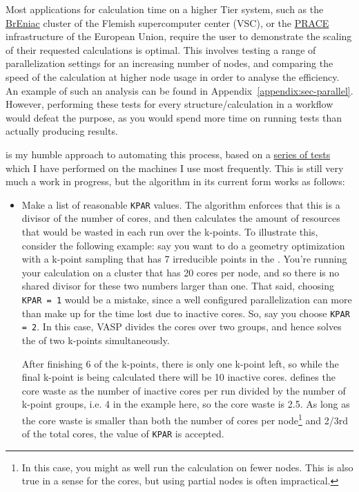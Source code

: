 \begin{refsection}
Most applications for calculation time on a higher Tier system, such as the 
\href{https://www.vscentrum.be/tier1}{BrEniac} cluster of the Flemish supercomputer center (VSC), or the 
\href{http://www.prace-ri.eu/}{PRACE} infrastructure of the European Union, 
require the user to demonstrate the scaling of their requested calculations is 
optimal. This involves testing a range of parallelization settings for an 
increasing number of nodes, and comparing the speed of the calculation at 
higher node usage in order to analyse the efficiency. An example of such an 
analysis can be found in Appendix~\ref{appendix:sec-parallel}. However, 
performing these tests for every structure/calculation in a workflow would 
defeat the purpose, as you would spend more time on running tests than 
actually producing results.  
 
 is my humble approach to automating this 
process, based on a 
\href{https://mybinder.org/v2/gh/mbercx/jupyter/master?filepath=parallel\%2Fparallel_analysis.ipynb}{series 
of tests} which I have performed on the machines I use most frequently. This 
is still very much a work in progress, but the algorithm in its current form 
works as follows: 
 
\begin{itemize} 
 
\item Make a list of reasonable \texttt{KPAR} values. The algorithm enforces 
that this is a divisor of the number of cores, and then calculates the amount 
of resources that would be wasted in each run over the k-points. To illustrate 
this, consider the following example: say you want to do a geometry 
optimization with a k-point sampling that has 7 irreducible points in the 
. You're running your calculation on a cluster that 
has 20 cores per node, and so there is no shared divisor for these two 
numbers larger than one. That said, choosing \texttt{KPAR = 1} would be a mistake, since a 
well configured parallelization can more than make up for the time lost due to inactive 
cores. So, say you choose \texttt{KPAR = 2}. In this case, \gls{VASP} 
divides the cores over two groups, and hence solves the  of two k-points simultaneously. 

After finishing 6 of the k-points, there is only one k-point left, so while 
the final k-point is being calculated there will be 10 inactive cores. 
 defines the core waste as the number of 
inactive cores per run divided by the number of k-point groups, i.e. 4 in the 
example here, so the core waste is 2.5. As long as the core waste is smaller 
than both the number of cores per node\footnote{In this case, you might as 
well run the calculation on fewer nodes. This is also true in a sense for the 
cores, but using partial nodes is often impractical.} and 2/3rd of the total 
cores, the value of \texttt{KPAR} is accepted. 
 

\end{itemize}
\end{refsection}
